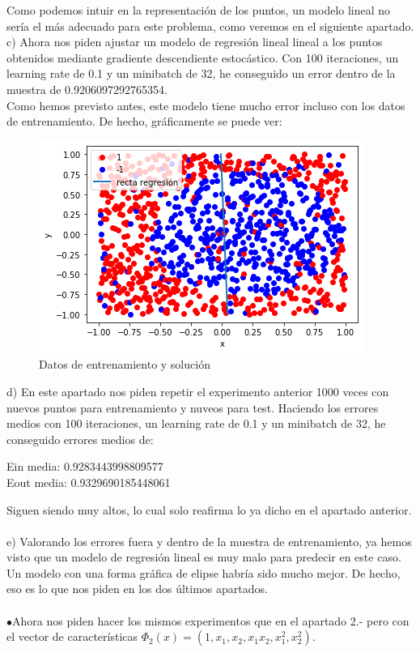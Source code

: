 \documentclass[12pt]{article}
\begin{document}
Como podemos intuir en la representación de los puntos, un modelo lineal no sería el más adecuado para este problema, como veremos en el siguiente apartado. \\
c) Ahora nos piden ajustar un modelo de regresión lineal lineal a los puntos obtenidos mediante gradiente descendiente estocástico. Con 100 iteraciones, un learning rate de 0.1 y un minibatch de 32, he conseguido un error dentro de la muestra de 0.9206097292765354. \\
Como hemos previsto antes, este modelo tiene mucho error incluso con los datos de entrenamiento. De hecho, gráficamente se puede ver:
\begin{figure}[H]
\centering
\includegraphics[scale=0.65]{Images/1000NSGD.png} 
\caption{Datos de entrenamiento y solución}
\label{etiqueta}
\end{figure}
d) En este apartado nos piden repetir el experimento anterior 1000 veces con nuevos puntos para entrenamiento y nuveos para test. Haciendo los errores medios con 100 iteraciones, un learning rate de 0.1 y un minibatch de 32, he conseguido errores medios de:
\begin{center}
Ein media:  0.9283443998809577\\
Eout media:  0.9329690185448061
\end{center}
Siguen siendo muy altos, lo cual solo reafirma lo ya dicho en el apartado anterior.\\\\
e) Valorando los errores fuera y dentro de la muestra de entrenamiento, ya hemos visto que un modelo de regresión lineal es muy malo para predecir en este caso. Un modelo con una forma gráfica de elipse habría sido mucho mejor. De hecho, eso es lo que nos piden en los dos últimos apartados. \\\\
$\bullet$Ahora nos piden hacer los mismos experimentos que en el apartado 2.- pero con el vector de características $\Phi_{2}(x)=(1,x_{1},x_{2},x_{1}x_{2},x_{1}^{2},x_2^{2})$.\\
\end{document}
